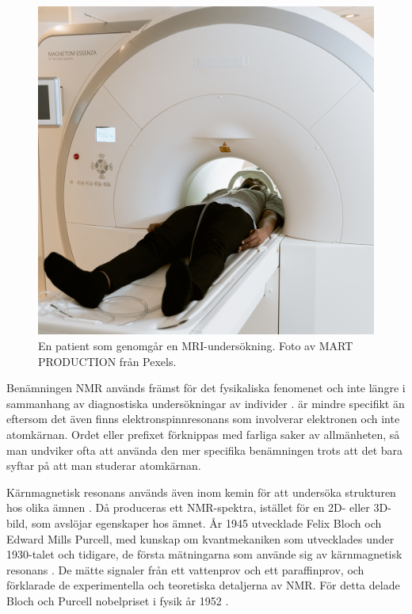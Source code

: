 \documentclass[11pt, a4paper]{article}
\begin{document}
\begin{figure}[ht]
	\centering
	\includegraphics[width=.75\textwidth]{mri_patient}
	\caption{En patient som genomgår en MRI-undersökning. Foto av MART PRODUCTION \parencite*{fig:mri_patient} från Pexels.}
	\label{fig:mri_patient}
\end{figure}

Benämningen NMR används främst för det fysikaliska fenomenet och inte längre i sammanhang av diagnostiska undersökningar av individer \parencite{nmr_eller_mri}.  är mindre specifikt än  eftersom det även finns elektronspinnresonans som involverar elektronen och inte atomkärnan. Ordet  eller prefixet  förknippas med farliga saker av allmänheten, så man undviker ofta att använda den mer specifika benämningen trots att det bara syftar på att man studerar atomkärnan.

Kärnmagnetisk resonans används även inom kemin för att undersöka strukturen hos olika ämnen \parencite{nmr_kemi}. Då produceras ett NMR-spektra, istället för en 2D- eller 3D-bild, som avslöjar egenskaper hos ämnet. År 1945 utvecklade Felix Bloch och Edward Mills Purcell, med kunskap om kvantmekaniken som utvecklades under 1930-talet och tidigare, de första mätningarna som använde sig av kärnmagnetisk resonans \parencite{mri_lärobok}. De mätte signaler från ett vattenprov och ett paraffinprov, och förklarade de experimentella och teoretiska detaljerna av NMR. För detta delade Bloch och Purcell nobelpriset i fysik år 1952 \parencite{nmr_nobelpris}.
\end{document}
